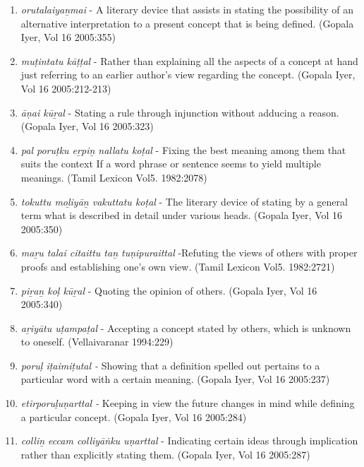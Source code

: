\begin{enumerate}
 \item \textit{orutalaiyaṉmai} - A literary device that assists in stating the possibility of an alternative interpretation to a present concept that is being defined. (Gopala Iyer, Vol 16 2005:355)

 \item \textit{muṭintatu kāṭṭal} - Rather than explaining all the aspects of a concept at hand just referring to an earlier author’s view regarding the concept. (Gopala Iyer, Vol 16 2005:212-213)

 \item \textit{āṇai kūṟal} - Stating a rule through injunction without adducing a reason. (Gopala Iyer, Vol 16 2005:323)

 \item \textit{pal poruṭku eṟpiṉ nallatu koṭal} - Fixing the best meaning among them that suits the context If a word phrase or sentence seems to yield multiple meanings. (Tamil Lexicon Vol5. 1982:2078)

 \item \textit{tokuttu moḻiyāṉ vakuttatu koṭal} - The literary device of stating by a general term what is described in detail under various heads. (Gopala Iyer, Vol 16 2005:350)

 \item \textit{maṟu talai citaittu taṉ tuṇipuraittal} -Refuting the views of others with proper proofs and establishing one’s own view. (Tamil Lexicon Vol5. 1982:2721)

 \item \textit{piṟaṉ koḷ kūṟal} - Quoting the opinion of others. (Gopala Iyer, Vol 16 2005:340)

 \item \textit{ aṟiyātu uṭampaṭal} - Accepting a concept stated by others, which is unknown to oneself. (Vellaivaranar 1994:229)

 \item \textit{poruḷ iṭaimiṭutal -} Showing that a definition spelled out pertains to a particular word with a certain meaning. (Gopala Iyer, Vol 16 2005:237) 

 \item \textit{etirporuḷuṇarttal -} Keeping in view the future changes in mind while defining a particular concept. (Gopala Iyer, Vol 16 2005:284)

 \item \textit{colliṉ eccam colliyāṅku uṇarttal} - Indicating certain ideas through implication rather than explicitly stating them. (Gopala Iyer, Vol 16 2005:287)


\end{enumerate}
